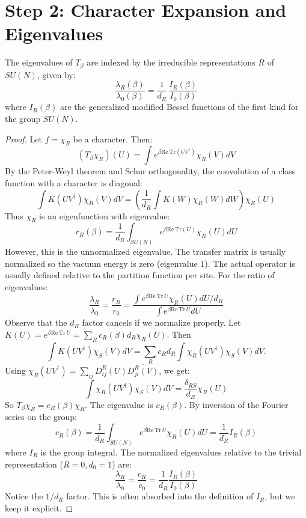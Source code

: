 \section{Step 2: Character Expansion and Eigenvalues}
\label{subsec:character-expansion}

\begin{theorem}
\label{thm:spectral-decomp}
The eigenvalues of $T_\beta$ are indexed by the irreducible representations $R$ of $SU(N)$, given by:
\begin{equation}
\frac{\lambda_R(\beta)}{\lambda_0(\beta)} = \frac{1}{d_R}\,\frac{I_R(\beta)}{I_0(\beta)}
\end{equation}
where $I_R(\beta)$ are the generalized modified Bessel functions of the first kind for the group $SU(N)$.
\end{theorem}

\begin{proof}
Let $f = \chi_R$ be a character. Then:
\[
(T_\beta \chi_R)(U) = \int e^{\beta \mathrm{Re} \, \mathrm{Tr}(UV^\dagger)} \chi_R(V) dV
\]
By the Peter-Weyl theorem and Schur orthogonality, the convolution of a class function with a character is diagonal:
\[
\int K(UV^\dagger) \chi_R(V) dV = \left( \frac{1}{d_R} \int K(W) \chi_R(W) dW \right) \chi_R(U)
\]
Thus $\chi_R$ is an eigenfunction with eigenvalue:
\[
r_R(\beta) = \frac{1}{d_R} \int_{SU(N)} e^{\beta \mathrm{Re} \, \mathrm{Tr}(U)} \chi_R(U) dU
\]
However, this is the unnormalized eigenvalue. The transfer matrix is usually normalized so the vacuum energy is zero (eigenvalue 1). The actual operator is usually defined relative to the partition function per site. For the ratio of eigenvalues:
\[
\frac{\lambda_R}{\lambda_0} = \frac{r_R}{r_0} = \frac{\int e^{\beta \mathrm{Re} \, \mathrm{Tr} \, U} \chi_R(U) dU / d_R}{\int e^{\beta \mathrm{Re} \, \mathrm{Tr} \, U} dU}
\]
Observe that the $d_R$ factor cancels if we normalize properly.
Let $K(U) = e^{\beta \mathrm{Re} \, \mathrm{Tr} \, U} = \sum_R c_R(\beta) d_R \chi_R(U)$.
Then
\[
\int K(UV^\dagger) \chi_S(V) dV = \sum_R c_R d_R \int \chi_R(U V^\dagger) \chi_S(V) dV.
\]
Using $\chi_R(UV^\dagger) = \sum_{ij} D_{ij}^R(U) \overline{D_{ji}^R(V)}$, we get:
\[
\int \chi_R(U V^\dagger) \chi_S(V) dV = \frac{\delta_{RS}}{d_R} \chi_R(U)
\]
So $T_\beta \chi_R = c_R(\beta) \chi_R$. The eigenvalue is $c_R(\beta)$.
By inversion of the Fourier series on the group:
\[
c_R(\beta) = \frac{1}{d_R} \int_{SU(N)} e^{\beta \mathrm{Re} \, \mathrm{Tr} \, U} \overline{\chi_R(U)} dU = \frac{1}{d_R} I_R(\beta)
\]
where $I_R$ is the group integral. The normalized eigenvalues relative to the trivial representation ($R=0, d_0=1$) are:
\[
\frac{\lambda_R}{\lambda_0} = \frac{c_R}{c_0} = \frac{1}{d_R} \frac{I_R(\beta)}{I_0(\beta)}
\]
Notice the $1/d_R$ factor. This is often absorbed into the definition of $I_R$, but we keep it explicit.
\end{proof}

